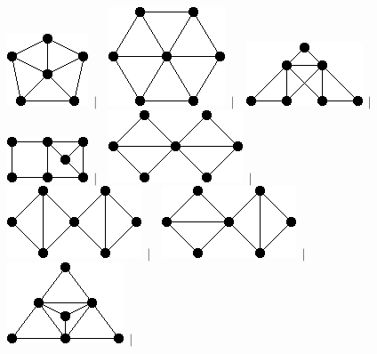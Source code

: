 \documentclass[11pt,paper=b5,footinclude,headinclude]{scrbook} %
\newtheorem{ex}{Vaja\hypertarget{sol:\theex}}[chapter]
\begin{document}
\begin{ex}
\begin{figure}
\includegraphics[scale=0.5]{smallGraphs/g_W5.png}$\,\mid\,$\
\includegraphics[scale=0.5]{smallGraphs/g_W6.png}$\,\mid\,$\
\includegraphics[scale=0.5]{smallGraphs/g_X1.png}$\,\mid\,$\
\includegraphics[scale=0.5]{smallGraphs/g_X10.png}$\,\mid\,$\
\includegraphics[scale=0.5]{smallGraphs/g_X100.png}$\,\mid\,$\
\includegraphics[scale=0.5]{smallGraphs/g_X101.png}$\,\mid\,$\
\includegraphics[scale=0.5]{smallGraphs/g_X102.png}$\,\mid\,$\
\includegraphics[scale=0.5]{smallGraphs/g_X103.png}$\,\mid\,$\

\end{figure}
\end{ex}
\end{document}
